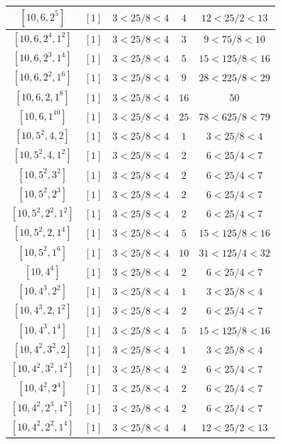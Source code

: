 \documentclass{article}%
\begin{document}
\begin{center}
\begin{longtable}{||c|c|c|c|c||}
$[10, 6, 2^{5}]$ & $[1]$ & $3 < 25/8 < 4$ & $4$ & $12 < 25/2 < 13$ \\ \hline 
$[10, 6, 2^{4}, 1^{2}]$ & $[1]$ & $3 < 25/8 < 4$ & $3$ & $9 < 75/8 < 10$ \\ \hline 
$[10, 6, 2^{3}, 1^{4}]$ & $[1]$ & $3 < 25/8 < 4$ & $5$ & $15 < 125/8 < 16$ \\ \hline 
$[10, 6, 2^{2}, 1^{6}]$ & $[1]$ & $3 < 25/8 < 4$ & $9$ & $28 < 225/8 < 29$ \\ \hline 
$[10, 6, 2, 1^{8}]$ & $[1]$ & $3 < 25/8 < 4$ & $16$ & $50$ \\ \hline 
$[10, 6, 1^{10}]$ & $[1]$ & $3 < 25/8 < 4$ & $25$ & $78 < 625/8 < 79$ \\ \hline 
$[10, 5^{2}, 4, 2]$ & $[1]$ & $3 < 25/8 < 4$ & $1$ & $3 < 25/8 < 4$ \\ \hline 
$[10, 5^{2}, 4, 1^{2}]$ & $[1]$ & $3 < 25/8 < 4$ & $2$ & $6 < 25/4 < 7$ \\ \hline 
$[10, 5^{2}, 3^{2}]$ & $[1]$ & $3 < 25/8 < 4$ & $2$ & $6 < 25/4 < 7$ \\ \hline 
$[10, 5^{2}, 2^{3}]$ & $[1]$ & $3 < 25/8 < 4$ & $2$ & $6 < 25/4 < 7$ \\ \hline 
$[10, 5^{2}, 2^{2}, 1^{2}]$ & $[1]$ & $3 < 25/8 < 4$ & $2$ & $6 < 25/4 < 7$ \\ \hline 
$[10, 5^{2}, 2, 1^{4}]$ & $[1]$ & $3 < 25/8 < 4$ & $5$ & $15 < 125/8 < 16$ \\ \hline 
$[10, 5^{2}, 1^{6}]$ & $[1]$ & $3 < 25/8 < 4$ & $10$ & $31 < 125/4 < 32$ \\ \hline 
$[10, 4^{4}]$ & $[1]$ & $3 < 25/8 < 4$ & $2$ & $6 < 25/4 < 7$ \\ \hline 
$[10, 4^{3}, 2^{2}]$ & $[1]$ & $3 < 25/8 < 4$ & $1$ & $3 < 25/8 < 4$ \\ \hline 
$[10, 4^{3}, 2, 1^{2}]$ & $[1]$ & $3 < 25/8 < 4$ & $2$ & $6 < 25/4 < 7$ \\ \hline 
$[10, 4^{3}, 1^{4}]$ & $[1]$ & $3 < 25/8 < 4$ & $5$ & $15 < 125/8 < 16$ \\ \hline 
$[10, 4^{2}, 3^{2}, 2]$ & $[1]$ & $3 < 25/8 < 4$ & $1$ & $3 < 25/8 < 4$ \\ \hline 
$[10, 4^{2}, 3^{2}, 1^{2}]$ & $[1]$ & $3 < 25/8 < 4$ & $2$ & $6 < 25/4 < 7$ \\ \hline 
$[10, 4^{2}, 2^{4}]$ & $[1]$ & $3 < 25/8 < 4$ & $2$ & $6 < 25/4 < 7$ \\ \hline 
$[10, 4^{2}, 2^{3}, 1^{2}]$ & $[1]$ & $3 < 25/8 < 4$ & $2$ & $6 < 25/4 < 7$ \\ \hline 
$[10, 4^{2}, 2^{2}, 1^{4}]$ & $[1]$ & $3 < 25/8 < 4$ & $4$ & $12 < 25/2 < 13$ \\ \hline 

\end{longtable}
\end{center}
\end{document}
